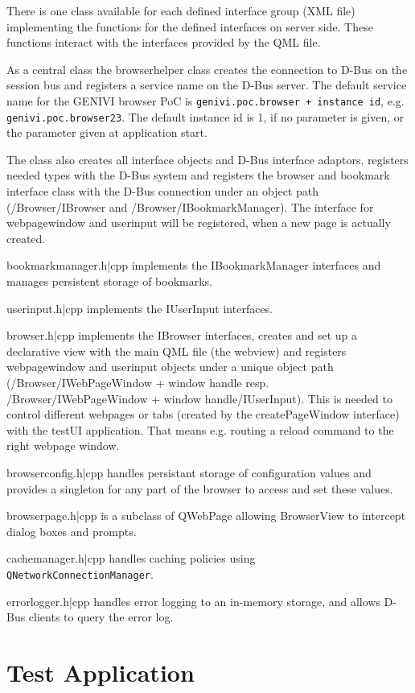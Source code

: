 \documentclass{pelagicore}
\begin{document}
There is one class available for each defined interface group (XML file)
implementing the functions for the defined interfaces on server side. These
functions interact with the interfaces provided by the QML file.

As a central class the browserhelper class creates the connection to D-Bus on
the session bus and registers a service name on the D-Bus server. The default
service name for the GENIVI browser PoC is {\tt genivi.poc.browser + instance
id}, e.g. {\tt genivi.poc.browser23}. The default instance id is 1, if no
parameter is given, or the parameter given at application start.

The class also creates all interface objects and D-Bus interface adaptors,
registers needed types with the D-Bus system and registers the browser and
bookmark interface class with the D-Bus connection under an object path
(/Browser/IBrowser and /Browser/IBookmarkManager). The interface for
webpagewindow and userinput will be registered, when a new page is actually
created.

bookmarkmanager.h|cpp implements the IBookmarkManager interfaces and manages
persistent storage of bookmarks.

userinput.h|cpp implements the IUserInput interfaces.

browser.h|cpp implements the IBrowser interfaces, creates and set up a
declarative view with the main QML file (the webview) and registers
webpagewindow and userinput objects under a unique object path
(/Browser/IWebPageWindow + window handle resp. \\/Browser/IWebPageWindow + window
handle/IUserInput). This is needed to control different webpages or tabs
(created by the createPageWindow interface) with the testUI application. That
means e.g. routing a reload command to the right webpage window.

browserconfig.h|cpp handles persistant storage of configuration values and
provides a singleton for any part of the browser to access and set these
values.

browserpage.h|cpp is a subclass of QWebPage allowing BrowserView to intercept
dialog boxes and prompts.

cachemanager.h|cpp handles caching policies using {\tt
QNetworkConnectionManager}.

errorlogger.h|cpp handles error logging to an in-memory storage, and allows
D-Bus clients to query the error log.

\section{Test Application}
\end{document}
